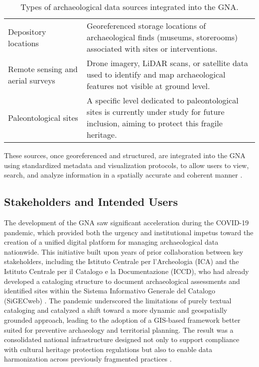 \begin{spacing}{1.5}
\begin{table}[H]
\begin{tabularx}{\textwidth}{ l >{\justifying\noindent\arraybackslash}p{} }
\cmidrule(lr){1-2}
Depository locations & Georeferenced storage locations of archaeological finds (museums, storerooms) associated with sites or interventions. \\
\cmidrule(lr){1-2}
Remote sensing and aerial surveys & Drone imagery, LiDAR scans, or satellite data used to identify and map archaeological features not visible at ground level. \\
\cmidrule(lr){1-2}
Paleontological sites & A specific level dedicated to paleontological sites is currently under study for future inclusion, aiming to protect this fragile heritage. \\
\bottomrule
\end{tabularx}
\vspace{0.5em}
\caption{Types of archaeological data sources integrated into the GNA.}
\label{tab:gna_data_sources}
\end{table}

\noindent These sources, once georeferenced and structured, are integrated into the GNA using standardized metadata and visualization protocols, to allow users to view, search, and analyze information in a spatially accurate and coherent manner \citep{boi_il_2023, acconcia_pubblicazione_2023}.

\subsection{Stakeholders and Intended Users}
The development of the GNA saw significant acceleration during the COVID-19 pandemic, which provided both the urgency and institutional impetus toward the creation of a unified digital platform for managing archaeological data nationwide. This initiative built upon years of prior collaboration between key stakeholders, including the Istituto Centrale per l’Archeologia (ICA) and the Istituto Centrale per il Catalogo e la Documentazione (ICCD), who had already developed a cataloging structure to document archaeological assessments and identified sites within the Sistema Informativo Generale del Catalogo (SiGECweb) \citep{calandra_il_2023, boi_il_2023}. The pandemic underscored the limitations of purely textual cataloging and catalyzed a shift toward a more dynamic and geospatially grounded approach, leading to the adoption of a GIS-based framework better suited for preventive archaeology and territorial planning. The result was a consolidated national infrastructure designed not only to support compliance with cultural heritage protection regulations but also to enable data harmonization across previously fragmented practices \citep{acconcia_pubblicazione_2023}.


\end{spacing}
